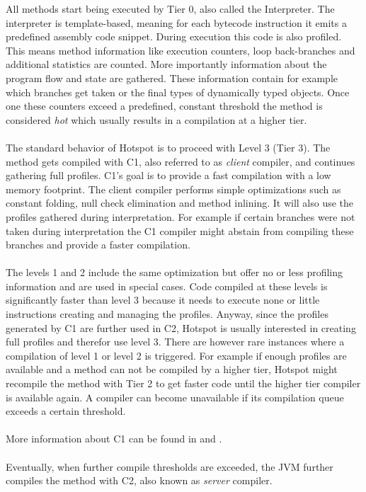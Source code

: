 All methods start being executed by Tier 0, also called the Interpreter.
The interpreter is template-based, meaning for each bytecode instruction it emits a predefined assembly code snippet.
During execution this code is also profiled. This means method information like execution counters, loop back-branches and additional statistics are counted. More importantly information about the program flow and state are gathered. These information contain for example which branches get taken or the final types of dynamically typed objects. Once one these counters exceed a predefined, constant threshold the method is considered \textit{hot} which usually results in a compilation at a higher tier.
\\\\
The standard behavior of Hotspot is to proceed with Level 3 (Tier 3). The method gets compiled with C1, also referred to as \textit{client} compiler, and continues gathering full profiles.
C1's goal is to provide a fast compilation with a low memory footprint.
The client compiler performs simple optimizations such as constant folding, null check elimination and method inlining.
It will also use the profiles gathered during interpretation. For example if certain branches were not taken during interpretation the C1 compiler might abstain from compiling these branches and provide a faster compilation.
\\\\
The levels 1 and 2 include the same optimization but offer no or less profiling information and are used in special cases. Code compiled at these levels is significantly faster than level 3 because it needs to execute none or little instructions creating and managing the profiles. Anyway, since the profiles generated by C1 are further used in C2, Hotspot is usually interested in creating full profiles and therefor use level 3.
There are however rare instances where a compilation of level 1 or level 2 is triggered. For example if enough profiles are available and a method can not be compiled by a higher tier, Hotspot might recompile the method with Tier 2 to get faster code until the higher tier compiler is available again. A compiler can become unavailable if its compilation queue exceeds a certain threshold.
\\\\
More information about C1 can be found in \cite{client_compiler_talk} and \cite{client_compiler}.
\\\\
Eventually, when further compile thresholds are exceeded, the JVM further compiles the method with C2, also known as \textit{server} compiler.
